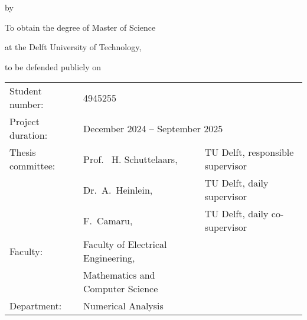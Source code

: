 \begin{titlepage}

    \begin{center}

        {\makeatletter
            \largecoverstyle\fontsize{45}{45}\selectfont\@title
            \makeatother}

        {\makeatletter
            \ifdefvoid{\@subtitle}{}{\bigskip\coverstyle\fontsize{20}{20}\selectfont\@subtitle}
            \makeatother}

        \bigskip
        \bigskip

        by

        \bigskip
        \bigskip

        {\makeatletter
            \coverstyle\fontsize{25}{25}\selectfont\@author
            \makeatother}

        \bigskip
        \bigskip

        To obtain the degree of Master of Science

        at the Delft University of Technology,


        to be defended publicly on {\makeatletter
                \makeatother}

        \vfill

        \begin{tabular}{lll}
            Student number:   & 4945255                                                                                \\
            Project duration: & \multicolumn{2}{l}{December 2024 -- September 2025}                                    \\
            Thesis committee: & Prof. \ H. Schuttelaars,                            & TU Delft, responsible supervisor \\
                              & Dr.\ A.\ Heinlein,                                  & TU Delft, daily supervisor       \\
                              & F.\ Camaru,                                         & TU Delft, daily co-supervisor    \\
            Faculty:          & Faculty of Electrical Engineering,                                                     \\
                              & Mathematics and Computer Science                                                       \\
            Department:       & Numerical Analysis                                                                     \\
        \end{tabular}


\end{center}
\end{titlepage}
